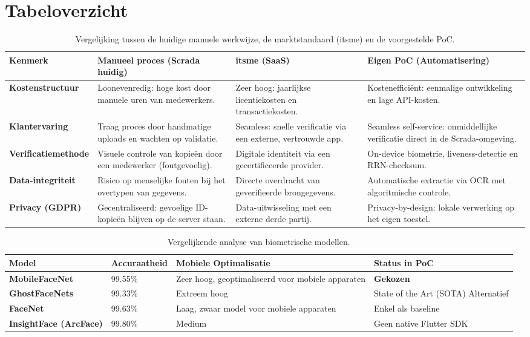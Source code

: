 \section{Tabeloverzicht}

\begin{table}[h!]
\centering
\caption{Vergelijking tussen de huidige manuele werkwijze, de marktstandaard (itsme) en de voorgestelde PoC.}
\label{tab:kyc-vergelijking-compleet}
\begin{tabular}{|l|p{3.5cm}|p{3.5cm}|p{3.5cm}|}
\hline
\textbf{Kenmerk} & \textbf{Manueel proces (Scrada huidig)} & \textbf{itsme (SaaS)} & \textbf{Eigen PoC (Automatisering)} \\ \hline
\textbf{Kostenstructuur} & Loonevenredig: hoge kost door manuele uren van medewerkers. & Zeer hoog: jaarlijkse licentiekosten en transactiekosten. & Kostenefficiënt: eenmalige ontwikkeling en lage API-kosten. \\ \hline
\textbf{Klantervaring} & Traag proces door handmatige uploads en wachten op validatie. & Seamless: snelle verificatie via een externe, vertrouwde app. & Seamless self-service: onmiddellijke verificatie direct in de Scrada-omgeving. \\ \hline
\textbf{Verificatiemethode} & Visuele controle van kopieën door een medewerker (foutgevoelig). & Digitale identiteit via een gecertificeerde provider. & On-device biometrie, liveness-detectie en RRN-checksum. \\ \hline
\textbf{Data-integriteit} & Risico op menselijke fouten bij het overtypen van gegevens. & Directe overdracht van geverifieerde brongegevens. & Automatische extractie via OCR met algoritmische controle. \\ \hline
\textbf{Privacy (GDPR)} & Gecentraliseerd: gevoelige ID-kopieën blijven op de server staan. & Data-uitwisseling met een externe derde partij. & Privacy-by-design: lokale verwerking op het eigen toestel. \\ \hline
\end{tabular}
\end{table}

\begin{table}[h!]
\centering
\caption{Vergelijkende analyse van biometrische modellen.}
\label{tab:model-vergelijking}
\begin{tabular}{|l|p{3.5cm}|p{3.5cm}|p{3cm}|}
\hline
\textbf{Model} & \textbf{Accuraatheid} & \textbf{Mobiele Optimalisatie} & \textbf{Status in PoC} \\ \hline
\textbf{MobileFaceNet} & 99.55\% \cite{ChenMobileFaceNet2018} & Zeer hoog, geoptimaliseerd voor mobiele apparaten & \textbf{Gekozen} \\ \hline
\textbf{GhostFaceNets} & 99.33\% \cite{MedenGhostFaceNets2022} & Extreem hoog & State of the Art (SOTA) Alternatief \\ \hline
\textbf{FaceNet} & 99.63\% \cite{Schroff2015} & Laag, zwaar model voor mobiele apparaten & Enkel als baseline \\ \hline
\textbf{InsightFace (ArcFace)} & 99.80\% \cite{DengArcface2019} & Medium & Geen native Flutter SDK \\ \hline
\end{tabular}
\end{table}